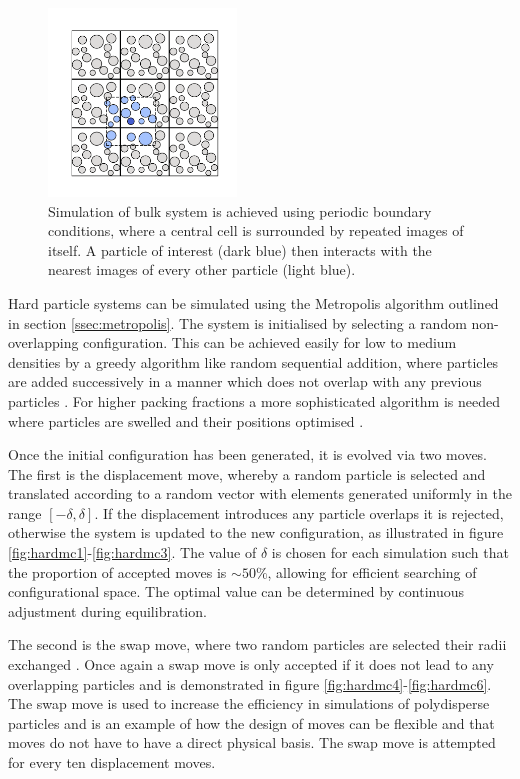 \begin{figure}[bt]
	\vspace{1cm}
	\includegraphics[width=5cm]{./figures/methods/mc_move_g.pdf}
	\caption{Simulation of bulk system is achieved using periodic boundary conditions, where a central cell is surrounded by repeated images of itself. A particle of interest (dark blue) then interacts with the nearest images of every other particle (light blue).}
	\label{fig:pbc}     
\end{figure}

Hard particle systems can be simulated using the Metropolis algorithm outlined in section \ref{ssec:metropolis}.
The system is initialised by selecting a random non\--overlapping configuration.
This can be achieved easily for low to medium densities by a greedy algorithm like random sequential addition, where particles are added successively in a manner which does not overlap with any previous particles \cite{Widom1966}.
For higher packing fractions a more sophisticated algorithm is needed where particles are swelled and their positions optimised \cite{Woodcock1976}.

Once the initial configuration has been generated, it is evolved via two \mc{} moves.
The first is the displacement move, whereby a random particle is selected and translated according to a random vector with elements generated uniformly in the range $\left[-\delta,\delta\right]$.
If the displacement introduces any particle overlaps it is rejected, otherwise the system is updated to the new configuration, as illustrated in figure \ref{fig:hardmc1}\--\ref{fig:hardmc3}.
The value of $\delta$ is chosen for each simulation such that the proportion of accepted moves is $\sim 50\%$, allowing for efficient searching of configurational space.
The optimal value can be determined by continuous adjustment during equilibration.

The second is the swap move, where two random particles are selected their radii exchanged \cite{Grigera2001,Ninarello2017}. 
Once again a swap move is only accepted if it does not lead to any overlapping particles and is demonstrated in figure \ref{fig:hardmc4}\--\ref{fig:hardmc6}.
The swap move is used to increase the efficiency in simulations of polydisperse particles and is an example of how the design of \mc{} moves can be flexible and that moves do not have to have a direct physical basis. 
The swap move is attempted for every ten displacement moves. 


